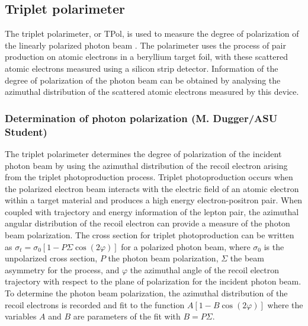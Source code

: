 \subsection{Triplet polarimeter \label{sec:tpol}}
The triplet polarimeter, or TPol, is used to measure the degree of polarization of the linearly polarized photon beam \cite{DUGGER2017115}.
The polarimeter uses the process of pair production on atomic electrons in a beryllium target foil, with these scattered atomic electrons measured using a silicon strip detector.
Information of the degree of polarization of the photon beam can be obtained by analysing the azimuthal distribution of the scattered atomic electrons measured by this device.

\subsubsection{Determination of photon polarization (M. Dugger/ASU Student)\label{sec:polarization}}
The triplet polarimeter determines the degree of polarization of the incident photon beam by using the azimuthal distribution of the recoil electron arising from the triplet photoproduction process.
Triplet photoproduction occurs when the polarized electron beam interacts with the electric field of an atomic electron within a target material and produces a high energy electron-positron pair.
When coupled with trajectory and energy information of the lepton pair, the azimuthal angular distribution of the recoil electron can provide a measure of the photon beam polarization.
The cross section for triplet photoproduction can be written as $\sigma_t = \sigma_0 [ 1 - P \Sigma \cos(2\varphi)]$ for a polarized photon beam, where $\sigma_0$ is the unpolarized cross section, $P$ the photon beam polarization, $\Sigma$ the beam asymmetry for the process, and $\varphi$ the azimuthal angle of the recoil electron trajectory with respect to the plane of polarization for the incident photon beam.
To determine the photon beam polarization, the azimuthal distribution of the recoil electrons is recorded and fit to the function $A [ 1- B \cos(2\varphi)]$  where the variables $A$ and $B$ are parameters of the fit with $B = P \Sigma$.

